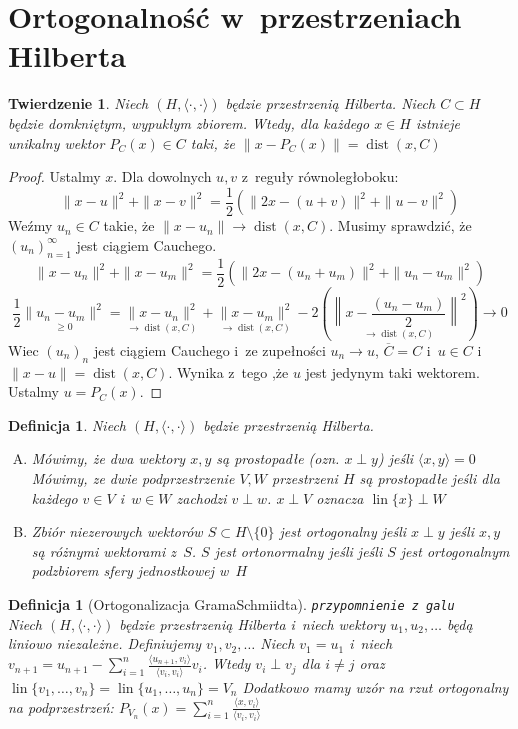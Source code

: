\documentclass[11pt]{mwrep}
\renewcommand{\[}{\begin{equation}}
\renewcommand{\]}{\end{equation}}
\newcommand{\lin}{\operatorname{lin}}
\newcommand{\dist}{\operatorname{dist}}
\newcommand{\scal}{\langle \cdot,\cdot \rangle}
\newtheorem{twr}[subsection]{Twierdzenie}%
\newtheorem{de}[subsection]{Definicja}
\newcounter{numer}
\begin{document}
\section{Ortogonalność w~przestrzeniach Hilberta}
\begin{twr}
	Niech $(H,\scal)$ będzie przestrzenią Hilberta. Niech $C\subset H$ będzie domkniętym, wypukłym zbiorem.
	Wtedy, dla każdego $x\in H$ istnieje unikalny wektor $P_C(x) \in C$ taki, że $\|x-P_C(x) \| = \dist(x,C)$
\end{twr}
\begin{proof}
	Ustalmy $x$. Dla dowolnych $u,v$ z~reguły równoległoboku: 
	$$\|x - u\|^2 + \|x - v\|^2 = \frac{1}{2}\left( \|2x - (u+v)\|^2 + \|u-v\|^2 \right)$$
	Weźmy $u_n\in C$ takie, że $\|x-u_n\| \to \dist(x,C)$.
	Musimy sprawdzić, że $(u_n)_{n=1}^\infty$ jest ciągiem Cauchego.
	$$\|x-u_n\|^2 + \|x-u_m\|^2 = \frac{1}{2}\left( \|2x -(u_n+u_m)\|^2 + \|u_n - u_m\|^2 \right)$$
	$$\frac{1}{2} \underset{\ge 0}{\|u_n-u_m\|^2} = \underset{\to \dist(x,C)}{\|x-u_n\|^2} + \underset{\to \dist(x,C)}{\|x-u_m\|^2} - 
	2 \left( \underset{\to \dist(x,C)}{\left\|x-\frac{(u_n-u_m)}{2}\right\|^2} \right) \longrightarrow 0$$
	Wiec $(u_n)_n$ jest ciągiem Cauchego i~ze zupełności $u_n \to u$, $\overline{C} = C$ i~$u\in C$ 
	i~$\|x -u\|= \dist(x,C)$. Wynika z~tego ,że $u$ jest jedynym taki wektorem. Ustalmy $u = P_C(x)$.
\end{proof}
\begin{de}
	Niech $(H,\scal)$ będzie przestrzenią Hilberta.
	\begin{enumerate}[(A)]
		\item	Mówimy, że dwa wektory $x,y$ są prostopadłe (ozn. $x\perp y$)  jeśli $\langle x,y \rangle=0$
			Mówimy, ze dwie podprzestrzenie $V,W$ przestrzeni $H$  są prostopadłe jeśli dla każdego $v \in V$ i~$w \in W$ zachodzi $v\perp w$.
			$x\perp V$ oznacza $\lin\{x\} \perp W$
		\item Zbiór niezerowych wektorów $S \subset H\setminus\{0\}$ jest ortogonalny jeśli $x\perp y$ jeśli $x,y$ są różnymi wektorami z~$S$.
			$S$ jest ortonormalny jeśli jeśli $S$ jest ortogonalnym podzbiorem sfery jednostkowej w~$H$ 
	\end{enumerate}
\end{de}
\begin{de}[Ortogonalizacja Grama\dywiz Schmiidta]
	\texttt{przypomnienie z~galu}\\
	Niech $(H,\scal)$ będzie przestrzenią Hilberta i~niech wektory $u_1,u_2,\ldots$ będą liniowo niezależne.
	Definiujemy $v_1,v_2,\ldots$ 
	Niech $v_1 = u_1$ i~niech $v_{n+1}= u_{n+1} - \sum_{i=1}^n\frac{\langle u_{n+1},v_i \rangle}{\langle v_i,v_i \rangle}v_i$. 
	Wtedy $v_i \perp v_j$ dla $i\not = j$ oraz $\lin\{v_1,\ldots,v_n\} = \lin\{u_1,\ldots,u_n\} = V_n$ 
	Dodatkowo mamy wzór na rzut ortogonalny na podprzestrzeń: $P_{V_n}(x) = \sum_{i=1}^n \frac{\langle x,v_i \rangle}{\langle v_i,v_i \rangle}$\\
\end{de}
	
\end{document}
